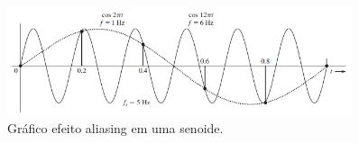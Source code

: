 



\begin{figure}[ht]
    \centering
    \caption{Gráfico efeito aliasing em uma senoide.}
    \begin{center}
        \includegraphics[width=0.9\textwidth]{img/print_aliasing.png}
    \end{center}
    \vspace{-0.5cm}
    

    
    \label{fig:Aliasing}
\end{figure}